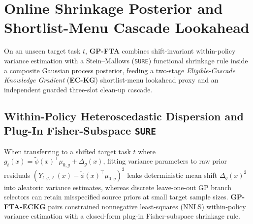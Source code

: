 \section{Online Shrinkage Posterior and Shortlist-Menu Cascade Lookahead}\label{sec:model}\label{sec:vkg}

On an unseen target task $t$, \textbf{GP-FTA} combines shift-invariant within-policy variance estimation with a Stein--Mallows (\texttt{SURE}) functional shrinkage rule inside a composite Gaussian process posterior, feeding a two-stage \emph{Eligible-Cascade Knowledge Gradient} (\textbf{EC-KG}) shortlist-menu lookahead proxy and an independent guarded three-slot clean-up cascade.

\subsection{Within-Policy Heteroscedastic Dispersion and Plug-In Fisher-Subspace \texttt{SURE}}

When transferring to a shifted target task $t$ where $g_t(x) = \tilde{\phi}(x)^\top \mu_{0,g} + \Delta_g(x)$, fitting variance parameters to raw prior residuals $(Y_{t,g,\ell}(x) - \tilde{\phi}(x)^\top\mu_{0,g})^2$ leaks deterministic mean shift $\Delta_g(x)^2$ into aleatoric variance estimates, whereas discrete leave-one-out GP branch selectors can retain misspecified source priors at small target sample sizes. \textbf{GP-FTA-ECKG} pairs constrained nonnegative least-squares (NNLS) within-policy variance estimation with a closed-form plug-in Fisher-subspace shrinkage rule.

